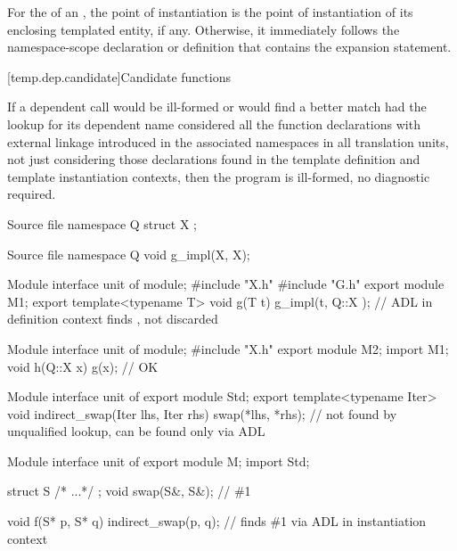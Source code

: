 \pnum
For the 
of an ,
the point of instantiation is the point of instantiation
of its enclosing templated entity, if any.
Otherwise, it immediately follows the namespace-scope declaration
or definition that contains the expansion statement.

[temp.dep.candidate]{Candidate functions}

\pnum
{}%
If a dependent call would be ill-formed or
would find a better match had the lookup for its dependent name
considered all the function declarations with external linkage
introduced in the associated namespaces in all translation units,
not just considering those declarations found in the template definition and
template instantiation contexts,
then the program is ill-formed, no diagnostic required.

\pnum
\begin{example}
\begin{codeblocktu}{Source file }
namespace Q {
  struct X { };
}
\end{codeblocktu}

\begin{codeblocktu}{Source file }
namespace Q {
  void g_impl(X, X);
}
\end{codeblocktu}

\begin{codeblocktu}{Module interface unit of }
module;
#include "X.h"
#include "G.h"
export module M1;
export template<typename T>
void g(T t) {
  g_impl(t, Q::X{ });   // ADL in definition context finds ,  not discarded
}
\end{codeblocktu}

\begin{codeblocktu}{Module interface unit of }
module;
#include "X.h"
export module M2;
import M1;
void h(Q::X x) {
   g(x);                // OK
}
\end{codeblocktu}
\end{example}

\pnum
\begin{example}
\begin{codeblocktu}{Module interface unit of }
export module Std;
export template<typename Iter>
void indirect_swap(Iter lhs, Iter rhs)
{
  swap(*lhs, *rhs);     //  not found by unqualified lookup, can be found only via ADL
}
\end{codeblocktu}

\begin{codeblocktu}{Module interface unit of }
export module M;
import Std;

struct S { /* ...*/ };
void swap(S&, S&);      // \#1

void f(S* p, S* q)
{
  indirect_swap(p, q);  // finds \#1 via ADL in instantiation context
}
\end{codeblocktu}
\end{example}

